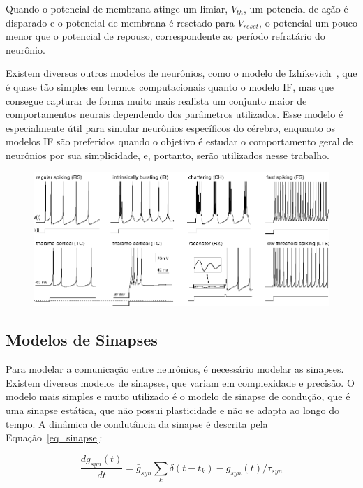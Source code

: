Quando o potencial de membrana atinge um limiar, $V_{th}$, um potencial de ação é disparado e o potencial de membrana é resetado
para $V_{reset}$, o potencial um pouco menor que o potencial de repouso, correspondente ao período refratário do neurônio.

Existem diversos outros modelos de neurônios, como o modelo de Izhikevich~\cite{izhikevichSimple2003}, que é quase tão simples em
termos computacionais quanto o modelo IF, mas que consegue capturar de forma muito mais realista um conjunto maior de
comportamentos neurais dependendo dos parâmetros utilizados. Esse modelo é especialmente útil para simular neurônios específicos
do cérebro, enquanto os modelos IF são preferidos quando o objetivo é estudar o comportamento geral de neurônios por sua
simplicidade, e, portanto, serão utilizados nesse trabalho.

\begin{figure}[!ht]
\centering\label{fig_izhikevich}
\includegraphics[width=\linewidth]{figuras/izhikevich.png}
\end{figure}

\subsection{Modelos de Sinapses}\label{subsection_modelos_sinapses}

Para modelar a comunicação entre neurônios, é necessário modelar as sinapses. Existem diversos modelos de sinapses, que variam em
complexidade e precisão. O modelo mais simples e muito utilizado é o modelo de sinapse de condução, que é uma sinapse estática,
que não possui plasticidade e não se adapta ao longo do tempo. A dinâmica de condutância da sinapse é descrita pela
Equação~\ref{eq_sinapse}:

\begin{equation}
\label{eq_sinapse}
\frac{dg_{syn}(t)}{dt} = \bar{g}_{syn}\sum_{k}{\delta(t-t_k)} - g_{syn}(t)/\tau_{syn}
\end{equation}

